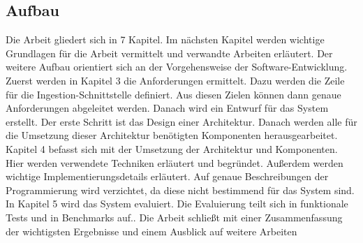 \subsection{Aufbau}
Die Arbeit gliedert sich in 7 Kapitel.
Im nächsten Kapitel werden wichtige Grundlagen für die Arbeit vermittelt und verwandte Arbeiten erläutert. 
Der weitere Aufbau orientiert sich an der Vorgehensweise der Software-Entwicklung.
Zuerst werden in Kapitel 3 die Anforderungen ermittelt.
Dazu werden die Zeile für die Ingestion-Schnittstelle definiert.
Aus diesen Zielen können dann genaue Anforderungen abgeleitet werden.
Danach wird ein Entwurf für das System erstellt.
Der erste Schritt ist das Design einer Architektur.
Danach werden alle für die Umsetzung dieser Architektur benötigten Komponenten herausgearbeitet.
Kapitel 4 befasst sich mit der Umsetzung der Architektur und Komponenten.
Hier werden verwendete Techniken erläutert und begründet.
Außerdem werden wichtige Implementierungsdetails erläutert.
Auf genaue Beschreibungen der Programmierung wird verzichtet, da diese nicht bestimmend für das System sind.
In Kapitel 5 wird das System evaluiert.
Die Evaluierung teilt sich in funktionale Tests und in Benchmarks auf..
Die Arbeit schließt mit einer Zusammenfassung der wichtigsten Ergebnisse und einem Ausblick auf weitere Arbeiten